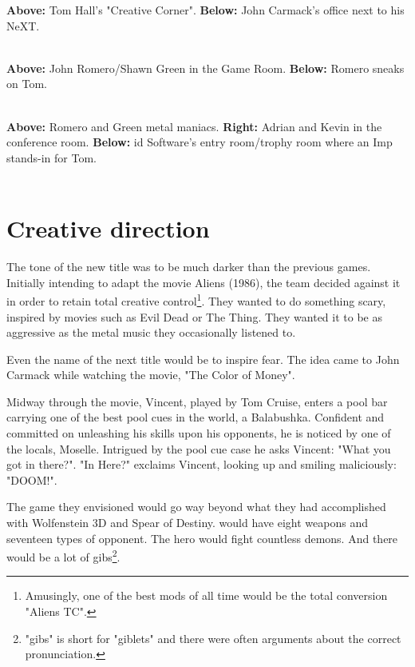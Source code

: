 \textbf{Above:} Tom Hall's "Creative Corner". \textbf{Below:} John Carmack's office next to his NeXT.\\
\\

\textbf{Above:} John Romero/Shawn Green in the Game Room. \textbf{Below:} Romero sneaks on Tom.\\
\\


\textbf{Above:} Romero and Green metal maniacs. \textbf{Right:} Adrian and Kevin in the conference room. \textbf{Below:} id Software's entry room/trophy room where an Imp stands-in for Tom.\\
\\


\section{Creative direction}
The tone of the new title was to be much darker than the previous games. Initially intending to adapt the movie Aliens (1986), the team decided against it in order to retain total creative control\footnote{Amusingly, one of the best mods of all time would be the total conversion "Aliens TC".}. They wanted to do something scary, inspired by movies such as Evil Dead or The Thing. They wanted it to be as aggressive as the metal music they occasionally listened to.\\
\par
Even the name of the next title would be to inspire fear. The idea came to John Carmack while watching the movie, "The Color of Money".\\ 
\par
Midway through the movie, Vincent, played by Tom Cruise, enters a pool bar carrying one of the best pool cues in the world, a Balabushka. Confident and committed on unleashing his skills upon his opponents, he is noticed by one of the locals, Moselle. Intrigued by the pool cue case he asks Vincent: "What you got in there?". "In Here?" exclaims Vincent, looking up and smiling maliciously: "DOOM!".\\
\par

\par
\par
{
\setlength{\abovecaptionskip}{11pt}
}
\par
\vspace{-15pt}
The game they envisioned would go way beyond what they had accomplished with Wolfenstein 3D and Spear of Destiny. \doom{} would have eight weapons and seventeen types of opponent. The hero would fight countless demons. And there would be a lot of gibs\footnote{"gibs" is short for "giblets" and there were often arguments about the correct pronunciation.}.

